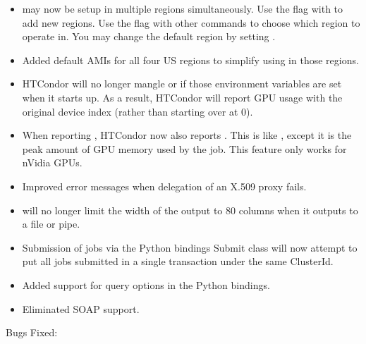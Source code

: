 \begin{itemize}

\item {} may now be setup in multiple regions simultaneously.
Use the  flag with  to add new regions.  Use the
 flag with other  commands to choose which
region to operate in.  You may change the default region by setting
.

\item Added default AMIs for all four US regions to simplify using
 in those regions.

\item HTCondor will no longer mangle  or
 if those environment variables are set when
it starts up.  As a result, HTCondor will report GPU usage with the
original device index (rather than starting over at 0).

\item When reporting , HTCondor now also reports
.  This is like , except it is
the peak amount of GPU memory used by the job.  This feature only works
for nVidia GPUs.

\item Improved error messages when delegation of an X.509 proxy fails.

\item {} will no longer limit the width of the output to 80 columns when it
outputs to a file or pipe.

\item Submission of jobs via the Python bindings Submit class will now attempt to put all
jobs submitted in a single transaction under the same ClusterId.

\item Added support for  query options in the Python bindings.

\item Eliminated SOAP support.

\end{itemize}

\noindent Bugs Fixed:

